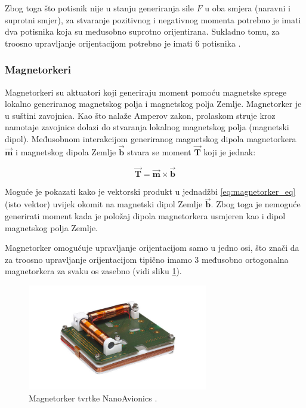 \documentclass[times, utf8, diplomski, numeric]{templates/template}
\begin{document}
{{{{                Zbog toga što potisnik nije u stanju generiranja sile $F$ u oba smjera (naravni i suprotni smjer), za stvaranje pozitivnog i negativnog momenta potrebno je imati dva potisnika koja su međusobno suprotno orijentirana. Sukladno tomu, za troosno upravljanje orijentacijom potrebno je imati 6 potisnika \cite{adcsKnjiga}.
            }

            \subsubsection{Magnetorkeri }{
                Magnetorkeri su aktuatori koji generiraju moment pomoću magnetske sprege lokalno generiranog magnetskog polja i magnetskog polja Zemlje. Magnetorker je u suštini zavojnica. Kao što nalaže Amperov zakon, prolaskom struje kroz namotaje zavojnice dolazi do stvaranja lokalnog magnetskog polja (magnetski dipol). Međusobnom interakcijom generiranog magnetskog dipola magnetorkera $\overrightarrow{\textbf{m}}$ i magnetskog dipola Zemlje $\overrightarrow{\textbf{b}}$ stvara se moment $\overrightarrow{\textbf{T}}$ koji je jednak:

                \begin{equation}
                    \label{eq:magnetorker_eq}
                    \overrightarrow{\textbf{T}} = \overrightarrow{\textbf{m}} \times \overrightarrow{\textbf{b}}
                \end{equation}

                Moguće je pokazati kako je vektorski produkt u jednadžbi \ref{eq:magnetorker_eq} (isto vektor) uvijek okomit na magnetski dipol Zemlje $\overrightarrow{\textbf{b}}$. Zbog toga je nemoguće generirati moment kada je položaj dipola magnetorkera usmjeren kao i dipol magnetskog polja Zemlje.

                Magnetorker omogućuje upravljanje orijentacijom samo u jedno osi, što znači da za troosno upravljanje orijentacijom tipično imamo 3 međusobno ortogonalna magnetorkera za svaku os zasebno (vidi sliku \ref{fig:magnetorquer_img}).

                \begin{figure}[htb]
                \centering
                \includegraphics[width=0.7\textwidth]{images/magnetorquer_img.jpg}
                \caption{Magnetorker tvrtke NanoAvionics \cite{magnetorquer_cite}.}
                \label{fig:magnetorquer_img}
                \end{figure}

}}}}
\end{document}
